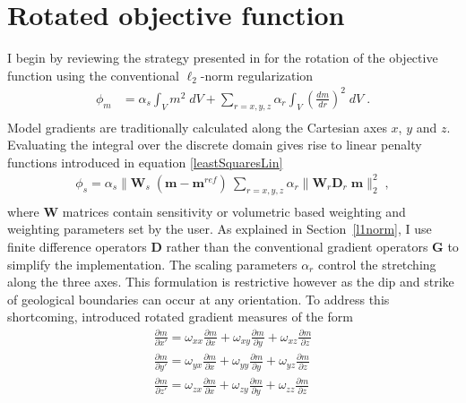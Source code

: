 \section{Rotated objective function}
I begin by reviewing the strategy presented in \cite{LiDWO2000} for the rotation of the objective function using the conventional $\ell_2$-norm regularization
\begin{equation}\label{integralReg}
\begin{split}
\phi_m &= \alpha_s \int_V m^2 \;dV + \sum_{r=x,y,z} \alpha_r \int_V \left( \frac{d m}{dr}\right)^2 \;dV\;. \\
\end{split}
\end{equation}
Model gradients are traditionally calculated along the Cartesian axes $x$, $y$ and $z$. Evaluating the integral over the discrete domain gives rise to linear penalty functions introduced in equation \eqref{leastSquaresLin}
\begin{equation}
\begin{split}
\phi_s = \alpha_s \|\mathbf{W}_s \;(\mathbf{m}-\mathbf{m}^{ref})\ \sum_{r=x,y,z} \alpha_r \|\mathbf{W}_r \mathbf{D}_r \;\mathbf{m}\|_2^2 \;,\\
\end{split}
\end{equation}
where $\mathbf{W}$ matrices contain sensitivity or volumetric based weighting and weighting parameters set by the user. As explained in Section~\ref{l1norm}, I use finite difference operators $\mathbf{D}$ rather than the conventional gradient operators $\mathbf{G}$ to simplify the implementation.
The scaling parameters $\alpha_r$ control the stretching along the three axes. This formulation is restrictive however as the dip and strike of geological boundaries can occur at any orientation. To address this shortcoming, \cite{LiDWO2000} introduced rotated gradient measures of the form
\begin{equation}\label{RotGradients}
\begin{split}
\frac{\partial m}{\partial x'} = \omega_{xx} \frac{\partial m}{\partial x} + \omega_{xy} \frac{\partial m}{\partial y} + \omega_{xz} \frac{\partial m}{\partial z} \\
\frac{\partial m}{\partial y'} = \omega_{yx} \frac{\partial m}{\partial x} + \omega_{yy} \frac{\partial m}{\partial y} + \omega_{yz} \frac{\partial m}{\partial z} \\
\frac{\partial m}{\partial z'} = \omega_{zx} \frac{\partial m}{\partial x} + \omega_{zy} \frac{\partial m}{\partial y} + \omega_{zz} \frac{\partial m}{\partial z}
\end{split}
\end{equation}
